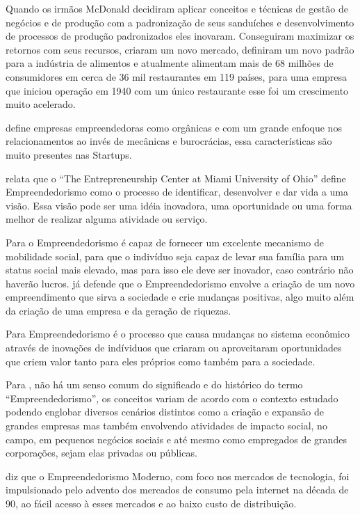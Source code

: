 Quando os irmãos McDonald decidiram aplicar conceitos e técnicas de gestão de negócios e de produção com a padronização de seus sanduíches e desenvolvimento de processos de produção padronizados eles inovaram. Conseguiram maximizar os retornos com seus recursos, criaram um novo mercado, definiram um novo padrão para a indústria de alimentos e atualmente alimentam mais de 68 milhões de consumidores em cerca de 36 mil restaurantes em 119 países, para uma empresa que iniciou operação em 1940 com um único restaurante esse foi um crescimento muito acelerado.

 define empresas empreendedoras como orgânicas e com um grande enfoque nos relacionamentos ao invés de mecânicas e burocrácias, essa características são muito presentes nas Startups.

 relata que o ``The Entrepreneurship Center at Miami University of Ohio'' define Empreendedorismo como o processo de identificar, desenvolver e dar vida a uma visão. Essa visão pode ser uma idéia inovadora, uma oportunidade ou uma forma melhor de realizar alguma atividade ou serviço.

Para  o Empreendedorismo é capaz de fornecer um excelente mecanismo de mobilidade social, para que o indivíduo seja capaz de levar sua família para um status social mais elevado, mas para isso ele deve ser inovador, caso contrário não haverão lucros.  já defende que o Empreendedorismo envolve a criação de um novo empreendimento que sirva a sociedade e crie mudanças positivas, algo muito além da criação de uma empresa e da geração de riquezas. 

Para  Empreendedorismo é o processo que causa mudanças no sistema econômico através de inovações de indíviduos que criaram ou aproveitaram oportunidades que criem valor tanto para eles próprios como também para a sociedade.

Para , não há um senso comum do significado e do histórico do termo ``Empreendedorismo'', os conceitos variam de acordo com o contexto estudado podendo englobar diversos cenários distintos como a criação e expansão de grandes empresas mas também envolvendo atividades de impacto social, no campo, em pequenos negócios sociais e até mesmo como empregados de grandes corporações, sejam elas privadas ou públicas. 

 diz que o Empreendedorismo Moderno, com foco nos mercados de tecnologia, foi impulsionado pelo advento dos mercados de consumo pela internet na década de 90, ao fácil acesso à esses mercados e ao baixo custo de distribuição.


